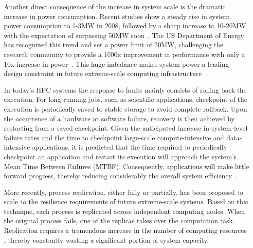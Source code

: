 Another direct consequence of the increase in system scale is the dramatic increase in power consumption. Recent studies show a steady rise in system power consumption to 1-3MW in 2008, followed by a sharp increase to 10-20MW, with the expectation of surpassing 50MW soon~\cite{doe_ascr_exascale_2011}. The US Department of Energy has recognized this trend and set a power limit of 20MW, challenging the research community to provide a 1000x improvement in performance with only a 10x increase in power~\cite{doe_ascr_exascale_2011}. %
This huge imbalance makes system power a leading design constraint in future extreme-scale computing infrastructure~\cite{Sarood2014}.%


In today's HPC systems the response to faults mainly consists of rolling back the execution. 
For long-running jobs, such as scientific applications, %
checkpoint of the execution is periodically saved to stable storage to avoid complete rollback.
Upon the occurrence of a hardware or software failure, recovery is then achieved by restarting from a saved checkpoint. Given the anticipated increase in system-level failure rates and the time to checkpoint large-scale compute-intensive and data-intensive applications, it is predicted that the time required to periodically checkpoint an application and restart its execution will approach the system's Mean Time Between Failures (MTBF). Consequently, applications will make little forward progress, thereby reducing considerably the overall system efficiency~\cite{ferreira_sc_2011}.%

More recently, process replication, either fully or partially, has been proposed to %
scale to the resilience requirements of future extreme-scale systems. %
Based on this technique, each process is replicated across independent computing
nodes. When the original process fails, one of the replicas takes over the computation task. Replication 
requires a tremendous increase in the number of computing resources%
, thereby constantly wasting a significant portion of system capacity. 

